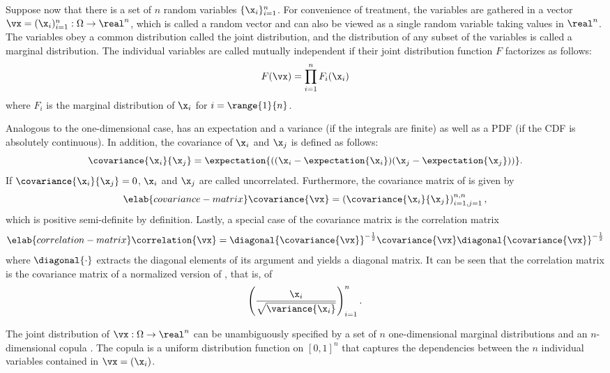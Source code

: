 Suppose now that there is a set of $n$ random variables $\{ \x_i \}_{i = 1}^n$.
For convenience of treatment, the variables are gathered in a vector $\vx =
(\x_i)_{i = 1}^n: \Omega \to \real^n$, which is called a random vector and can
also be viewed as a single random variable taking values in $\real^n$. The
variables obey a common distribution called the joint distribution, and the
distribution of any subset of the variables is called a marginal distribution.
The individual variables are called mutually independent if their joint
distribution function $F$ factorizes as follows:
\[
  F(\vx) = \prod_{i = 1}^n F_i(\x_i)
\]
where $F_i$ is the marginal distribution of $\x_i$ for $i = \range{1}{n}$.

Analogous to the one-dimensional case, \vx has an expectation and a variance (if
the integrals are finite) as well as a \ac{PDF} (if the \ac{CDF} is absolutely
continuous). In addition, the covariance of $\x_i$ and $\x_j$ is defined as
follows:
\[
  \covariance{\x_i}{\x_j} = \expectation{((\x_i - \expectation{\x_i})(\x_j - \expectation{\x_j}))}.
\]
If $\covariance{\x_i}{\x_j} = 0$, $\x_i$ and $\x_j$ are called uncorrelated.
Furthermore, the covariance matrix of \vx is given by
\begin{equation} \elab{covariance-matrix}
  \covariance{\vx} = \left(\covariance{\x_i}{\x_j}\right)_{i = 1, j = 1}^{n, n},
\end{equation}
which is positive semi-definite by definition. Lastly, a special case of the
covariance matrix is the correlation matrix
\begin{equation} \elab{correlation-matrix}
  \correlation{\vx} = \diagonal{\covariance{\vx}}^{-\frac{1}{2}} \covariance{\vx} \diagonal{\covariance{\vx}}^{-\frac{1}{2}}
\end{equation}
where $\diagonal{\cdot}$ extracts the diagonal elements of its argument and
yields a diagonal matrix. It can be seen that the correlation matrix is the
covariance matrix of a normalized version of \vx, that is, of
\[
  \left(\frac{\x_i}{\sqrt{\variance{\x_i}}}\right)_{i = 1}^n.
\]

The joint distribution of $\vx: \Omega \to \real^n$ can be unambiguously
specified by a set of $n$ one-dimensional marginal distributions and an
$n$-dimensional copula \cite{nelsen2006}. The copula is a uniform distribution
function on $[0, 1]^n$ that captures the dependencies between the $n$ individual
variables contained in $\vx = (\x_i)$.
